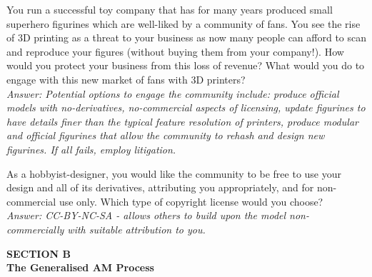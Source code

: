 \documentclass{article}
\begin{document}
\begin{questions}
\begin{questions}
  \item You run a successful toy company that has for many years produced small superhero figurines which are well-liked by a community of fans. You see the rise of 3D printing as a threat to your business as now many people can afford to scan and reproduce your figures (without buying them from your company!). How would you protect your business from this loss of revenue? What would you do to engage with this new market of fans with 3D printers?
  \\[0.2cm] \emph{Answer: Potential options to engage the community include: produce official models with no-derivatives, no-commercial aspects of licensing, update figurines to have details finer than the typical feature resolution of printers, produce modular and official figurines that allow the community to rehash and design new figurines. If all fails, employ litigation.}
  \item As a hobbyist-designer, you would like the community to be free to use your design and all of its derivatives, attributing you appropriately, and for non-commercial use only. Which type of copyright license would you choose?
  \\[0.2cm] \emph{Answer: CC-BY-NC-SA - allows others to build upon the model non-commercially with suitable attribution to you.}
\end{questions}
\end{questions}

\begin{center}
  \large{\bf SECTION B\\[5mm]
    The Generalised AM Process}\\[20mm]
\end{center}
\end{document}
